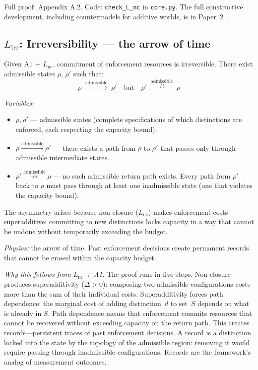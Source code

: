 \documentclass[11pt]{article}
\begin{document}
Full proof: Appendix A.2.  Code: \texttt{check\_L\_nc} in \texttt{core.py}.  The full constructive development, including countermodels for additive worlds, is in Paper~2~\cite{P2}.


\subsection{\texorpdfstring{$L_{\mathrm{irr}}$}{Lirr}: Irreversibility --- the arrow of time}

\begin{tcolorbox}[apfbox, title={Lemma $L_{\mathrm{irr}}$ (Irreversibility of Enforcement Commitment)}]
Given A1 $+$ $L_{\mathrm{nc}}$, commitment of enforcement resources is irreversible.  There exist admissible states $\rho$, $\rho'$ such that:
\begin{equation}
\rho \;\xrightarrow{\text{admissible}}\; \rho' \quad\text{but}\quad \rho' \;\overset{\text{admissible}}{\nrightarrow}\; \rho
\end{equation}

\smallskip\noindent\textit{Variables:}
\begin{itemize}[nosep,leftmargin=2em]
\item $\rho, \rho'$ --- admissible states (complete specifications of which distinctions are enforced, each respecting the capacity bound).
\item $\rho \xrightarrow{\text{admissible}} \rho'$ --- there exists a path from $\rho$ to $\rho'$ that passes only through admissible intermediate states.
\item $\rho' \overset{\text{admissible}}{\nrightarrow} \rho$ --- no such admissible return path exists.  Every path from $\rho'$ back to $\rho$ must pass through at least one inadmissible state (one that violates the capacity bound).
\end{itemize}

\smallskip\noindent
The asymmetry arises because non-closure ($L_{\mathrm{nc}}$) makes enforcement costs superadditive: committing to new distinctions locks capacity in a way that cannot be undone without temporarily exceeding the budget.
\end{tcolorbox}

\textit{Physics:} the arrow of time.  Past enforcement decisions create permanent records that cannot be erased within the capacity budget.

\textit{Why this follows from $L_{\mathrm{nc}}$ + A1:} The proof runs in five steps.  Non-closure produces superadditivity ($\Delta > 0$): composing two admissible configurations costs more than the sum of their individual costs.  Superadditivity forces path dependence: the marginal cost of adding distinction~$d$ to set~$S$ depends on what is already in $S$.  Path dependence means that enforcement commits resources that cannot be recovered without exceeding capacity on the return path.  This creates records---persistent traces of past enforcement decisions.  A record is a distinction locked into the state by the topology of the admissible region: removing it would require passing through inadmissible configurations.  Records are the framework's analog of measurement outcomes.
\end{document}

